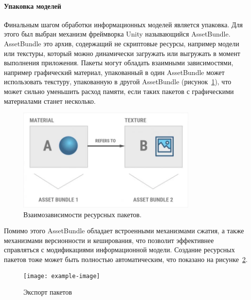 ﻿\paragraph{Упаковка моделей}

Финальным шагом обработки информационных моделей является упаковка.
Для этого был выбран механизм фреймворка Unity называющийся AssetBundle.
AssetBundle это архив, содержащий не скриптовые ресурсы,
например модели или текстуры, который можно динамически загружать
или выгружать в момент выполнения приложения.
Пакеты могут обладать взаимными зависимостями, например графический материал,
упакованный в один AssetBundle может использовать текстуру,
упакованную в другой AssetBundle (рисунок~\ref{figure:AssetBundleDependency}),
что может сильно уменьшить расход памяти, если таких пакетов
с графическими материалами станет несколько.%
\cite{DocUnity,UnityAssetsResourcesBundles}

\begin{figure}[ht]
    \centering
    \includegraphics[width=0.8\textwidth]{images/AssetBundleDependency.png}
    \caption{Взаимозависимости ресурсных пакетов.%
    \cite{UnityAssetsResourcesBundles}}
    \label{figure:AssetBundleDependency}
\end{figure}

Помимо этого AssetBundle обладает встроенными механизмами сжатия,
а также механизмами версионности и кеширования,
что позволит эффективнее справляться с модификациями информационной модели.%
\cite{DocUnity,UnityAssetsResourcesBundles}
Создание ресурсных пакетов тоже может быть полностью автоматическим,
что показано на рисунке~\ref{figure:SExportBundles}.

\begin{figure}[ht]
    \centering
    \texttt{[image: example-image]}
    \caption{Экспорт пакетов}
    \label{figure:SExportBundles}
\end{figure}


